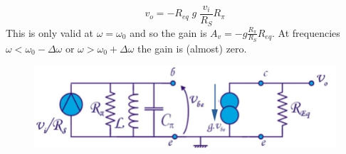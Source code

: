 $$
v_o = - R_{eq} \; g \; \frac{v_i}{R_S} R_\pi
$$
This is only valid at $\omega = \omega_0$ and so the gain is $A_v = - g \frac{R_\pi}{R_S} R_{eq}$. At frequencies $\omega < \omega_0 - \Delta \omega$ or $\omega > \omega_0 + \Delta \omega$ the gain is (almost) zero.
\begin{figure}[h!]
	\centering
	\includegraphics[width=12cm]{figures/ch09/selective4.jpg}
	\caption{}
	\label{fig:selective4}
\end{figure}

